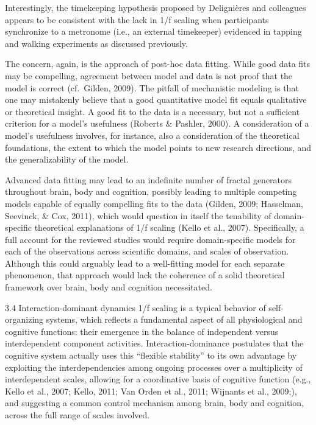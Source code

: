\documentclass[12pt,]{book}
\begin{document}
Interestingly, the timekeeping hypothesis proposed by Delignières and colleagues appears to be consistent with the lack in 1/f scaling when participants synchronize to a metronome (i.e., an external timekeeper) evidenced in tapping and walking experiments as discussed previously.

The concern, again, is the approach of post-hoc data fitting. While good data fits may be compelling, agreement between model and data is not proof that the model is correct (cf.~Gilden, 2009). The pitfall of mechanistic modeling is that one may mistakenly believe that a good quantitative model fit equals qualitative or theoretical insight. A good fit to the data is a necessary, but not a sufficient criterion for a model's usefulness (Roberts \& Pashler, 2000). A consideration of a model's usefulness involves, for instance, also a consideration of the theoretical foundations, the extent to which the model points to new research directions, and the generalizability of the model.

Advanced data fitting may lead to an indefinite number of fractal generators throughout brain, body and cognition, possibly leading to multiple competing models capable of equally compelling fits to the data (Gilden, 2009; Hasselman, Seevinck, \& Cox, 2011), which would question in itself the tenability of domain-specific theoretical explanations of 1/f scaling (Kello et al., 2007). Specifically, a full account for the reviewed studies would require domain-specific models for each of the observations across scientific domains, and scales of observation. Although this could arguably lead to a well-fitting model for each separate phenomenon, that approach would lack the coherence of a solid theoretical framework over brain, body and cognition necessitated.

3.4 Interaction-dominant dynamics
1/f scaling is a typical behavior of self-organizing systems, which reflects a fundamental aspect of all physiological and cognitive functions: their emergence in the balance of independent versus interdependent component activities. Interaction-dominance postulates that the cognitive system actually uses this ``flexible stability'' to its own advantage by exploiting the interdependencies among ongoing processes over a multiplicity of interdependent scales, allowing for a coordinative basis of cognitive function (e.g., Kello et al., 2007; Kello, 2011; Van Orden et al., 2011; Wijnants et al., 2009;), and suggesting a common control mechanism among brain, body and cognition, across the full range of scales involved.
\end{document}
